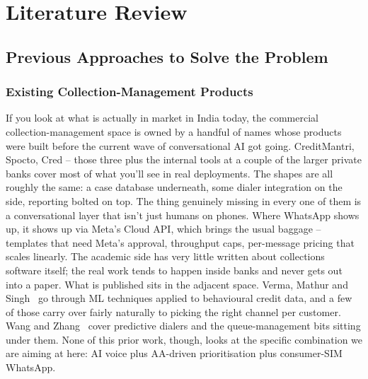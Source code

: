 \chapter{Literature Review}
\label{Chapter 2}

\section{Previous Approaches to Solve the Problem}

\subsection{Existing Collection-Management Products}
If you look at what is actually in market in India today, the commercial collection-management space is owned by a handful of names whose products were built before the current wave of conversational AI got going. CreditMantri, Spocto, Cred -- those three plus the internal tools at a couple of the larger private banks cover most of what you'll see in real deployments. The shapes are all roughly the same: a case database underneath, some dialer integration on the side, reporting bolted on top. The thing genuinely missing in every one of them is a conversational layer that isn't just humans on phones. Where WhatsApp shows up, it shows up via Meta's Cloud API, which brings the usual baggage -- templates that need Meta's approval, throughput caps, per-message pricing that scales linearly. The academic side has very little written about collections software itself; the real work tends to happen inside banks and never gets out into a paper. What is published sits in the adjacent space. Verma, Mathur and Singh~\cite{vermaml} go through ML techniques applied to behavioural credit data, and a few of those carry over fairly naturally to picking the right channel per customer. Wang and Zhang~\cite{contactcenter} cover predictive dialers and the queue-management bits sitting under them. None of this prior work, though, looks at the specific combination we are aiming at here: AI voice plus AA-driven prioritisation plus consumer-SIM WhatsApp.

